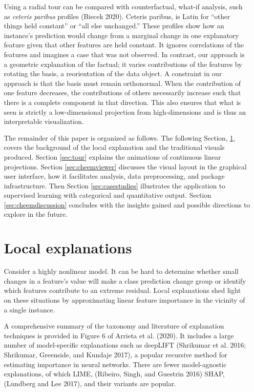 \documentclass[
]{article}
\begin{document}
Using a radial tour can be compared with counterfactual, what-if analysis, such as \emph{ceteris paribus} profiles (Biecek 2020). Ceteris paribus, is Latin for ``other things held constant'' or ``all else unchanged.'' These profiles show how an instance's prediction would change from a marginal change in one explanatory feature given that other features are held constant. It ignores correlations of the features and imagines a case that was not observed. In contrast, our approach is a geometric explanation of the factual; it varies contributions of the features by rotating the basis, a reorientation of the data object. A constraint in our approach is that the basis must remain orthonormal. When the contribution of one feature decreases, the contributions of others necessarily increase such that there is a complete component in that direction. This also ensures that what is seen is strictly a low-dimensional projection from high-dimensions and is thus an interpretable visualization.

The remainder of this paper is organized as follows. The following Section, \ref{sec:explanations}, covers the background of the local explanation and the traditional visuals produced. Section \ref{sec:tour} explains the animations of continuous linear projections. Section \ref{sec:cheemviewer} discusses the visual layout in the graphical user interface, how it facilitates analysis, data preprocessing, and package infrastructure. Then Section \ref{sec:casestudies} illustrates the application to supervised learning with categorical and quantitative output. Section \ref{sec:cheemdiscussion} concludes with the insights gained and possible directions to explore in the future.

\hypertarget{sec:explanations}{%
\section{Local explanations}\label{sec:explanations}}

Consider a highly nonlinear model. It can be hard to determine whether small changes in a feature's value will make a class prediction change group or identify which features contribute to an extreme residual. Local explanations shed light on these situations by approximating linear feature importance in the vicinity of a single instance.

A comprehensive summary of the taxonomy and literature of explanation techniques is provided in Figure 6 of Arrieta et al. (2020). It includes a large number of model-specific explanations such as deepLIFT (Shrikumar et al. 2016; Shrikumar, Greenside, and Kundaje 2017), a popular recursive method for estimating importance in neural networks. There are fewer model-agnostic explanations, of which LIME, (Ribeiro, Singh, and Guestrin 2016) SHAP, (Lundberg and Lee 2017), and their variants are popular.
\end{document}
